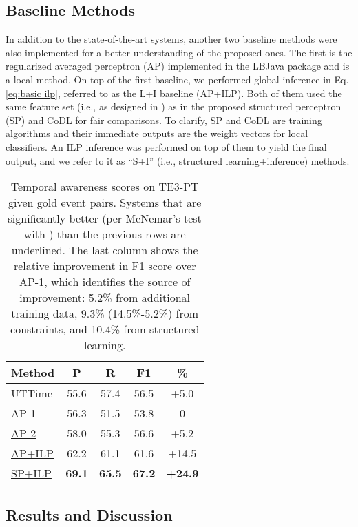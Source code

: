 \documentclass[11pt,letterpaper]{article}
\newcommand{\final}[1]{#1}
\begin{document}
{\subsection{Baseline Methods}
In addition to the state-of-the-art systems, another two baseline methods were also implemented for a better understanding of the proposed ones.
The first is the regularized averaged perceptron (AP) \citep{FreundSc98} implemented in the LBJava package \citep{RizzoloRo10} and \final{is} a local method. 
On top of the first baseline, we performed global inference in Eq.\eqref{eq:basic ilp}, referred to as the L+I baseline (AP+ILP).
Both of them used the same feature set \final{(i.e., as designed in \citet{DoLuRo12})}  as in the proposed structured perceptron (SP) and CoDL for fair comparisons.
To clarify, SP and CoDL are training algorithms and their immediate outputs are the weight vectors {} for local classifiers. An ILP inference was performed on top of them to yield the final output, and we refer to it as {``S+I''} (i.e., structured learning+inference) methods.
	
\begin{table}[htbp!]
	\centering
	\caption{\small Temporal awareness scores on TE3-PT given gold event pairs. Systems that are significantly better (per McNemar's test with ) than the previous rows are underlined. The last column shows the relative improvement in F1 score over AP-1, which identifies the source of improvement: 5.2\% from additional training data, 9.3\% (14.5\%-5.2\%) from constraints, and 10.4\% from structured learning.}
	\label{tab: know nones}
	\begin{tabular}{ l|c|c|c|c } 
		\hline
		Method & P & R & F1 & \%\\ 
		\hline
		UTTime & 55.6 & 57.4 & 56.5 & +5.0 \\ 
		\hline
		AP-1 & 56.3 & 51.5 & 53.8 & 0 \\
		\underline{AP-2} & 58.0 & 55.3 & 56.6 & +5.2\\ 
		\underline{AP+ILP} & 62.2 & 61.1 & 61.6 & +14.5 \\
		\hline
		\underline{SP+ILP} & \textbf{69.1} & \textbf{65.5} & \textbf{67.2} & \textbf{+24.9}\\
		\hline
	\end{tabular}
\end{table}

\subsection{Results and Discussion}
}
\end{document}
